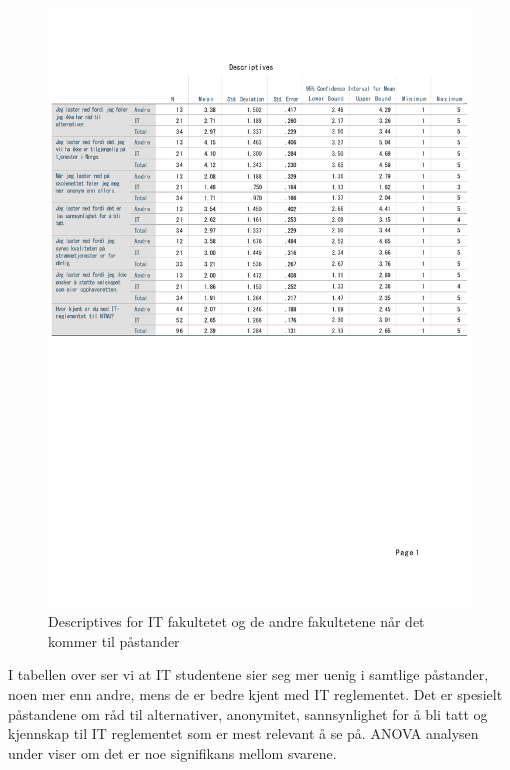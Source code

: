 \begin{figure}[H]
    \centering
    \includegraphics[scale=0.6]{case_1/bilder/fakultet_pastander_descriptive.pdf}
    \caption[Descriptives av fakultetene på påstander]{Descriptives for IT fakultetet og de andre fakultetene når det kommer til påstander}
    \label{fig:fakultet_pastander_descriptive}
\end{figure}

I tabellen over ser vi at IT studentene sier seg mer uenig i samtlige påstander, noen mer enn andre, mens de er bedre kjent med IT reglementet. Det er spesielt påstandene om råd til alternativer, anonymitet, sannsynlighet for å bli tatt og kjennskap til IT reglementet som er mest relevant å se på. ANOVA analysen under viser om det er noe signifikans mellom svarene. 

